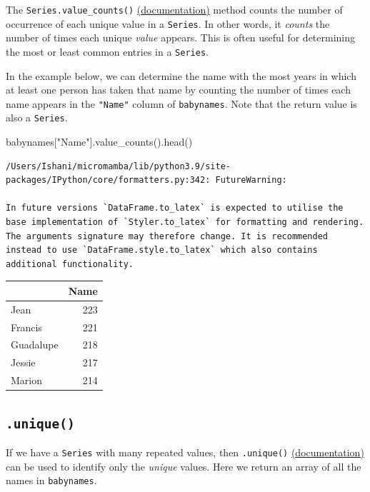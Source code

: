 \documentclass[
  letterpaper,
  DIV=11,
  numbers=noendperiod]{scrreprt}
\newenvironment{Shaded}{\begin{snugshade}}{\end{snugshade}}
\newcommand{\NormalTok}[1]{\textcolor[rgb]{0.00,0.23,0.31}{#1}}
\newcommand{\StringTok}[1]{\textcolor[rgb]{0.13,0.47,0.30}{#1}}
\begin{document}
The \texttt{Series.value\_counts()}
\href{https://pandas.pydata.org/docs/reference/api/pandas.Series.value_counts.html}{(documentation)}
method counts the number of occurrence of each unique value in a
\texttt{Series}. In other words, it \emph{counts} the number of times
each unique \emph{value} appears. This is often useful for determining
the most or least common entries in a \texttt{Series}.

In the example below, we can determine the name with the most years in
which at least one person has taken that name by counting the number of
times each name appears in the \texttt{"Name"} column of
\texttt{babynames}. Note that the return value is also a
\texttt{Series}.

\begin{Shaded}
\begin{Highlighting}[]
\NormalTok{babynames[}\StringTok{"Name"}\NormalTok{].value\_counts().head()}
\end{Highlighting}
\end{Shaded}

\begin{verbatim}
/Users/Ishani/micromamba/lib/python3.9/site-packages/IPython/core/formatters.py:342: FutureWarning:

In future versions `DataFrame.to_latex` is expected to utilise the base implementation of `Styler.to_latex` for formatting and rendering. The arguments signature may therefore change. It is recommended instead to use `DataFrame.style.to_latex` which also contains additional functionality.
\end{verbatim}

\begin{tabular}{lr}
\toprule
{} &  Name \\
\midrule
Jean      &   223 \\
Francis   &   221 \\
Guadalupe &   218 \\
Jessie    &   217 \\
Marion    &   214 \\
\bottomrule
\end{tabular}

\hypertarget{unique}{%
\subsection{\texorpdfstring{\texttt{.unique()}}{.unique()}}\label{unique}}

If we have a \texttt{Series} with many repeated values, then
\texttt{.unique()}
\href{https://pandas.pydata.org/docs/reference/api/pandas.unique.html}{(documentation)}
can be used to identify only the \emph{unique} values. Here we return an
array of all the names in \texttt{babynames}.
\end{document}
